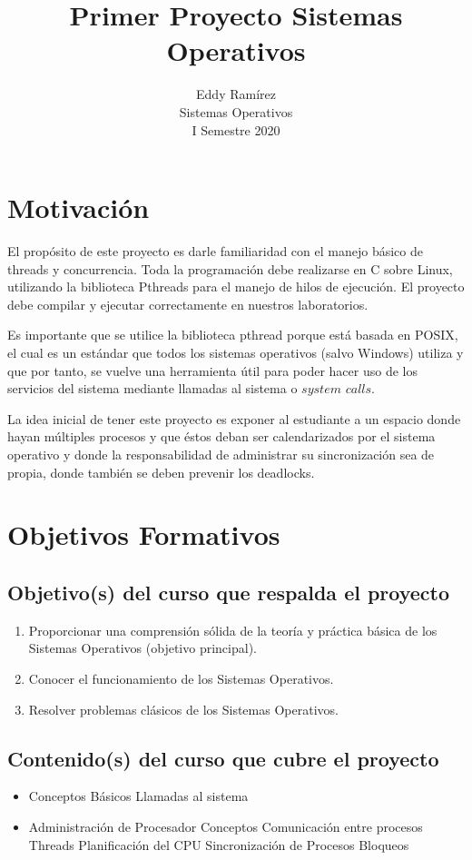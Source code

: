 \documentclass[11pt]{article}
\title{\textbf{Primer Proyecto Sistemas Operativos}}
\author{Eddy Ramírez \\ Sistemas Operativos \\ I Semestre 2020  }
\date{}
\begin{document}
\maketitle

\section{Motivación}

El propósito de este proyecto es darle familiaridad con el manejo básico de threads y concurrencia. Toda la programación debe realizarse en C sobre Linux, utilizando la biblioteca Pthreads para el manejo de hilos de ejecución. El proyecto debe compilar y ejecutar correctamente en nuestros laboratorios. 

Es importante que se utilice la biblioteca pthread porque está basada en POSIX, el cual es un estándar que todos los sistemas operativos (salvo Windows) utiliza y que por tanto, se vuelve una herramienta útil para poder hacer uso de los servicios del sistema mediante llamadas al sistema o $system$ $calls$.

La idea inicial de tener este proyecto es exponer al estudiante a un espacio donde hayan múltiples procesos y que éstos deban ser calendarizados por el sistema operativo y donde la responsabilidad de administrar su sincronización sea de propia, donde también se deben prevenir los deadlocks.

\section{Objetivos Formativos}

\subsection{Objetivo(s) del curso que respalda el proyecto}
\begin{enumerate}
\item Proporcionar una comprensión sólida de la teoría y práctica básica de los
Sistemas Operativos (objetivo principal).
\item Conocer el funcionamiento de los Sistemas Operativos.
\item Resolver problemas clásicos de los Sistemas Operativos.
\end{enumerate}

\subsection{Contenido(s) del curso que cubre el proyecto}
\begin{itemize}

\item Conceptos Básicos
\subitem Llamadas al sistema
\item Administración de Procesador
\subitem Conceptos
\subitem Comunicación entre procesos
\subitem Threads
\subitem Planificación del CPU
\subitem Sincronización de Procesos
\subitem Bloqueos

\end{itemize}
\end{document}
